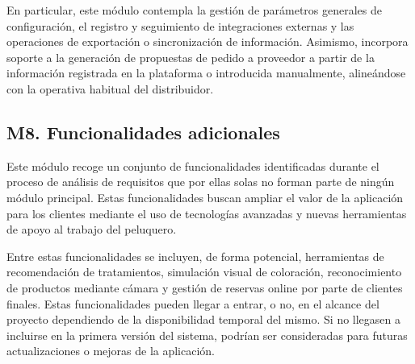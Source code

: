 En particular, este módulo contempla la gestión de parámetros generales de configuración, el registro y seguimiento de integraciones externas y las operaciones de exportación o sincronización de información. Asimismo, incorpora soporte a la generación de propuestas de pedido a proveedor a partir de la información registrada en la plataforma o introducida manualmente, alineándose con la operativa habitual del distribuidor.

\subsection{M8. Funcionalidades adicionales}

Este módulo recoge un conjunto de funcionalidades identificadas durante el proceso de análisis de requisitos que por ellas solas no forman parte de ningún módulo principal. Estas funcionalidades buscan ampliar el valor de la aplicación para los clientes mediante el uso de tecnologías avanzadas y nuevas herramientas de apoyo al trabajo del peluquero.

Entre estas funcionalidades se incluyen, de forma potencial, herramientas de recomendación de tratamientos, simulación visual de coloración, reconocimiento de productos mediante cámara y gestión de reservas online por parte de clientes finales. Estas funcionalidades pueden llegar a entrar, o no, en el alcance del proyecto dependiendo de la disponibilidad temporal del mismo. Si no llegasen a incluirse en la primera versión del sistema, podrían ser consideradas para futuras actualizaciones o mejoras de la aplicación.
